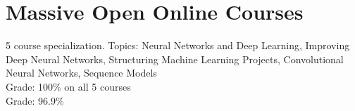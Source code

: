 
\section{Massive Open Online Courses}
5 course specialization. Topics: Neural Networks and Deep Learning, Improving Deep Neural Networks, Structuring Machine Learning Projects, Convolutional Neural Networks, Sequence Models \\
Grade: 100\% on all 5 courses \\
\vspace{3pt}
Grade: 96.9\% \\
\sectionsep
